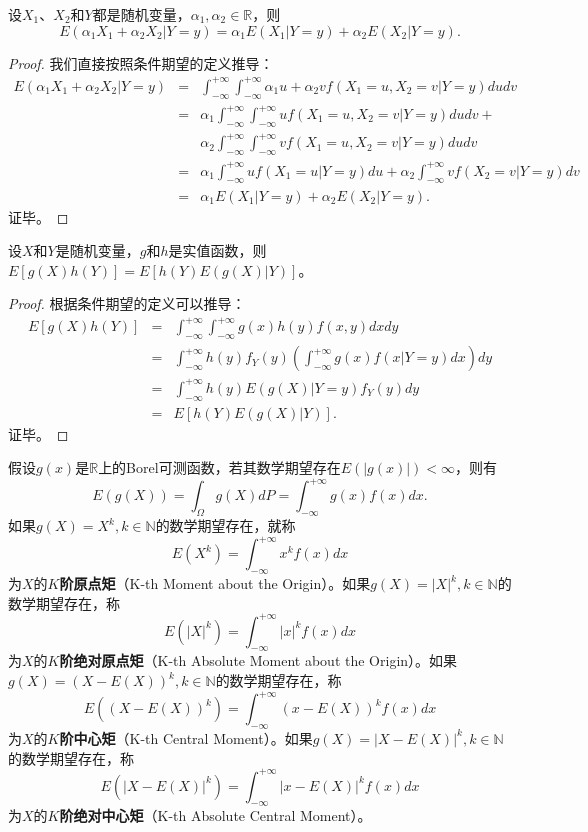 \begin{property}[线性相加性]
设$X_1$、$X_2$和$Y$都是随机变量，$\alpha_1,\alpha_2\in \mathbb R$，则
\[
    E(\alpha_1 X_1 + \alpha_2 X_2|Y=y)=\alpha_1 E(X_1|Y=y) + \alpha_2 E(X_2|Y=y).
\]
\end{property}
\begin{proof}
我们直接按照条件期望的定义推导：
\[
    \begin{array}{lcl}
        E(\alpha_1 X_1 + \alpha_2 X_2|Y=y) &=& \int_{-\infty}^{+\infty} \int_{-\infty}^{+\infty} \alpha_1 u + \alpha_2 v f(X_1=u, X_2=v|Y=y) dudv\\
        &=&\alpha_1 \int_{-\infty}^{+\infty} \int_{-\infty}^{+\infty} u f(X_1=u, X_2=v|Y=y) dudv + \\
        &&\alpha_2 \int_{-\infty}^{+\infty} \int_{-\infty}^{+\infty} v f(X_1=u, X_2=v|Y=y) dudv\\
        &=& \alpha_1 \int_{-\infty}^{+\infty}  u f(X_1=u|Y=y) du + \alpha_2 \int_{-\infty}^{+\infty}  v f(X_2=v|Y=y) dv\\
        &=& \alpha_1 E(X_1|Y=y) + \alpha_2 E(X_2|Y=y).
    \end{array}
\]
证毕。
\end{proof}

\begin{property}
设$X$和$Y$是随机变量，$g$和$h$是实值函数，则$E[g(X)h(Y)] = E[h(Y)E(g(X)|Y)]$。
\end{property}
\begin{proof}
根据条件期望的定义可以推导：
\[
    \begin{array}{lcl}
        E[g(X)h(Y)] &=& \int_{-\infty}^{+\infty} \int_{-\infty}^{+\infty} g(x) h(y) f(x,y) dxdy\\
        &=& \int_{-\infty}^{+\infty} h(y) f_Y(y) (\int_{-\infty}^{+\infty} g(x) f(x|Y=y) dx) dy\\
        &=& \int_{-\infty}^{+\infty} h(y) E(g(X)|Y=y) f_Y(y) dy\\
        &=& E[h(Y)E(g(X)|Y)].
    \end{array}
\]
证毕。
\end{proof}

\begin{definition}[原点矩和中心矩]
假设$g(x)$是$\mathbb R$上的Borel可测函数，若其数学期望存在$E(|g(x)|) < \infty$，则有
\[
    E(g(X)) = \int_\Omega g(X) dP = \int_{-\infty}^{+\infty} g(x) f(x) dx.
\]
如果$g(X)=X^k, k\in \mathbb N$的数学期望存在，就称
\[
    E(X^k) = \int_{-\infty}^{+\infty} x^k f(x) dx
\]
为$X$的\textbf{$K$阶原点矩}（K-th Moment about the Origin）。如果$g(X)=|X|^k, k\in \mathbb N$的数学期望存在，称
\[
    E(|X|^k) = \int_{-\infty}^{+\infty} |x|^k f(x) dx
\]
为$X$的\textbf{$K$阶绝对原点矩}（K-th Absolute Moment about the Origin）。如果$g(X)=(X-E(X))^k, k\in \mathbb N$的数学期望存在，称
\[
    E((X-E(X))^k) = \int_{-\infty}^{+\infty} (x-E(X))^k f(x) dx
\]
为$X$的\textbf{$K$阶中心矩}（K-th Central Moment）。如果$g(X)=|X-E(X)|^k, k\in \mathbb N$的数学期望存在，称
\[
    E(|X-E(X)|^k) = \int_{-\infty}^{+\infty} |x-E(X)|^k f(x) dx
\]
为$X$的\textbf{$K$阶绝对中心矩}（K-th Absolute Central Moment）。
\end{definition}

